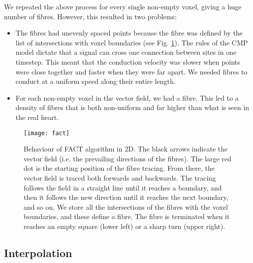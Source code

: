 We repeated the above process for every single non-empty voxel, giving a huge number of fibres. However, this resulted in two problems:
\begin{itemize}
    \item The fibres had unevenly spaced points because the fibre was defined by the list of intersections with voxel boundaries (see Fig. \ref{fig:fact}). The rules of the CMP model dictate that a signal can cross one connection between sites in one timestep. This meant that the conduction velocity was slower when points were close together and faster when they were far apart. We needed fibres to conduct at a uniform speed along their entire length.
    \item For each non-empty voxel in the vector field, we had a fibre. This led to a density of fibres that is both non-uniform and far higher than what is seen in the real heart.
\end{itemize}

\begin{figure} \begin{mdframed}
    \centering
    \texttt{[image: fact]}
    \caption{Behaviour of FACT algorithm in 2D. The black arrows indicate the vector field (i.e. the prevailing directions of the fibres). The large red dot is the starting position of the fibre tracing. From there, the vector field is traced both forwards and backwards. The tracing follows the field in a straight line until it reaches a boundary, and then it follows the new direction until it reaches the next boundary, and so on. We store all the intersections of the fibres with the voxel boundaries, and these define a fibre.
    The fibre is terminated when it reaches an empty square (lower left) or a sharp turn (upper right).}
    \label{fig:fact}
\end{mdframed} \end{figure}

\subsection{Interpolation}

